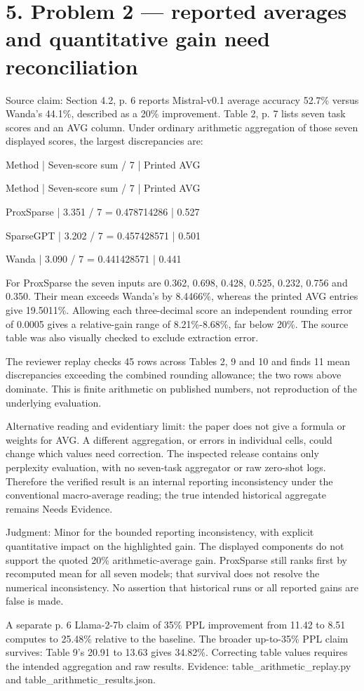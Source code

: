 \documentclass[10pt]{article}
\begin{document}
\section*{5. Problem 2 — reported averages and quantitative gain need reconciliation}
Source claim: Section 4.2, p. 6 reports Mistral-v0.1 average accuracy 52.7\% versus Wanda’s 44.1\%, described as a 20\% improvement. Table 2, p. 7 lists seven task scores and an AVG column. Under ordinary arithmetic aggregation of those seven displayed scores, the largest discrepancies are:\par
Method | Seven-score sum / 7 | Printed AVG\par
Method | Seven-score sum / 7 | Printed AVG\par
ProxSparse | 3.351 / 7 = 0.478714286 | 0.527\par
SparseGPT | 3.202 / 7 = 0.457428571 | 0.501\par
Wanda | 3.090 / 7 = 0.441428571 | 0.441\par
For ProxSparse the seven inputs are 0.362, 0.698, 0.428, 0.525, 0.232, 0.756 and 0.350. Their mean exceeds Wanda’s by 8.4466\%, whereas the printed AVG entries give 19.5011\%. Allowing each three-decimal score an independent rounding error of 0.0005 gives a relative-gain range of 8.21\%-8.68\%, far below 20\%. The source table was also visually checked to exclude extraction error.\par
The reviewer replay checks 45 rows across Tables 2, 9 and 10 and finds 11 mean discrepancies exceeding the combined rounding allowance; the two rows above dominate. This is finite arithmetic on published numbers, not reproduction of the underlying evaluation.\par
Alternative reading and evidentiary limit: the paper does not give a formula or weights for AVG. A different aggregation, or errors in individual cells, could change which values need correction. The inspected release contains only perplexity evaluation, with no seven-task aggregator or raw zero-shot logs. Therefore the verified result is an internal reporting inconsistency under the conventional macro-average reading; the true intended historical aggregate remains Needs Evidence.\par
Judgment: Minor for the bounded reporting inconsistency, with explicit quantitative impact on the highlighted gain. The displayed components do not support the quoted 20\% arithmetic-average gain. ProxSparse still ranks first by recomputed mean for all seven models; that survival does not resolve the numerical inconsistency. No assertion that historical runs or all reported gains are false is made.\par
A separate p. 6 Llama-2-7b claim of 35\% PPL improvement from 11.42 to 8.51 computes to 25.48\% relative to the baseline. The broader up-to-35\% PPL claim survives: Table 9’s 20.91 to 13.63 gives 34.82\%. Correcting table values requires the intended aggregation and raw results. Evidence: table\_arithmetic\_replay.py and table\_arithmetic\_results.json.\par
\end{document}
